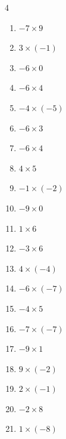 \begin{multicols}{4}
\begin{enumerate}
  \item $-7\times 9$
        \phantom{$=-63$}

  \item $3\times (-1)$
        \phantom{$=-3$}

  \item $-6\times 0$
        \phantom{$=0$}

  \item $-6\times 4$
        \phantom{$=-24$}

  \item $-4\times (-5)$
        \phantom{$=20$}

  \item $-6\times 3$
        \phantom{$=-18$}

  \item $-6\times 4$
        \phantom{$=-24$}

  \item $4\times 5$
        \phantom{$=20$}

  \item $-1\times (-2)$
        \phantom{$=2$}

  \item $-9\times 0$
        \phantom{$=0$}

  \item $1\times 6$
        \phantom{$=6$}

  \item $-3\times 6$
        \phantom{$=-18$}

  \item $4\times (-4)$
        \phantom{$=-16$}

  \item $-6\times (-7)$
        \phantom{$=42$}

  \item $-4\times 5$
        \phantom{$=-20$}

  \item $-7\times (-7)$
        \phantom{$=49$}

  \item $-9\times 1$
        \phantom{$=-9$}

  \item $9\times (-2)$
        \phantom{$=-18$}

  \item $2\times (-1)$
        \phantom{$=-2$}

  \item $-2\times 8$
        \phantom{$=-16$}

  \item $1\times (-8)$
        \phantom{$=-8$}


\end{enumerate}
\end{multicols}
